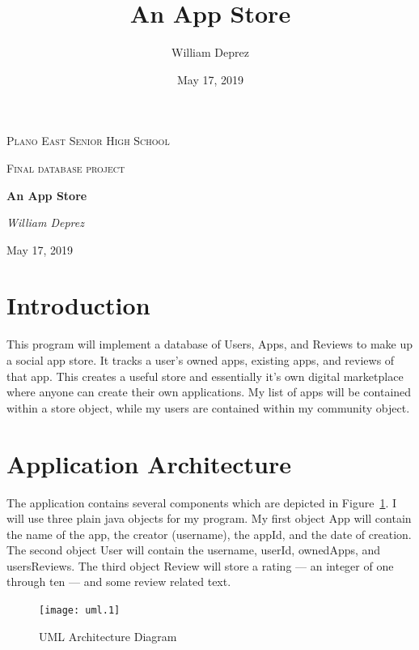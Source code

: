 \documentclass{article}
\title{An App Store}
\author{William Deprez}
\date{May 17, 2019}
\begin{document}
\begin{titlepage}
    \centering
    {\scshape\LARGE Plano East Senior High School \par}
    \vspace{1cm}
    {\scshape\Large Final database project\par}
    \vspace{1.5cm}
    {\huge\bfseries An App Store\par}
    \vspace{2cm}
    \Large\textit{William Deprez}
    \vfill
    {\large May 17, 2019\par}
\end{titlepage}

\section{Introduction}
This program will implement a database of Users, Apps, and Reviews to make up a social app store.
It tracks a user’s owned apps, existing apps, and reviews of that app.
This creates a useful store and essentially it’s own digital marketplace where anyone can create their own applications.
My list of apps will be contained within a store object, while my users are contained within my community object.

\section{Application Architecture}

The application contains several components which are depicted in Figure~\ref{UML}.
I will use three plain java objects for my program.
My first object App will contain the name of the app, the creator (username), the appId, and the date of creation.
The second object User will contain the username, userId, ownedApps, and usersReviews.
The third object Review will store a rating --- an integer of one through ten --- and some review related text.
\begin{figure}[h]
    \centering
    \texttt{[image: uml.1]}
    \caption{UML Architecture Diagram\label{UML}}
\end{figure}
\end{document}
